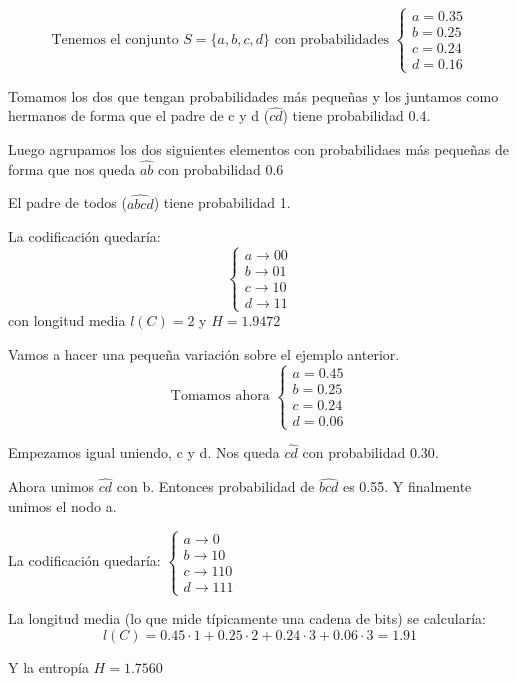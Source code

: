 \begin{example}
	\[\text{Tenemos el conjunto } S = \{ a , b , c , d\} \text{ con probabilidades }
	\begin{cases}
	a = 0.35\\b = 0.25\\ c= 0.24\\ d = 0.16
	\end{cases}\]

	Tomamos los dos que tengan probabilidades más pequeñas y los juntamos como hermanos de forma que el padre de c y d ($\widehat{cd}$) tiene probabilidad 0.4.

	Luego agrupamos los dos siguientes elementos con probabilidaes más pequeñas de forma que nos queda $\widehat{ab}$ con probabilidad 0.6

	El padre de todos ($\widehat{abcd}$) tiene probabilidad 1.

	La codificación quedaría:
	 $$\begin{cases}
	 a \rightarrow 00\\ b \rightarrow 01 \\c \rightarrow 10 \\ d \rightarrow 11
	 \end{cases}$$
	 con longitud media $l(C) = 2$ y $H = 1.9472$
\end{example}


\begin{example}
	Vamos a hacer una pequeña variación sobre el ejemplo anterior.
	\[\text{Tomamos ahora }\begin{cases}
	a = 0.45 \\ b = 0.25\\c = 0.24 \\ d = 0.06
	\end{cases}\]

	Empezamos igual uniendo, c y d. Nos queda $\widehat{cd}$ con probabilidad 0.30.

	Ahora unimos $\widehat{cd}$ con b. Entonces probabilidad de $ \widehat{bcd}$ es 0.55. Y finalmente unimos el nodo a.

	La codificación quedaría: $\begin{cases}
	a \rightarrow 0 \\ b \rightarrow 10 \\ c \rightarrow 110\\ d \rightarrow 111
	\end{cases}$

	La longitud media (lo que mide típicamente una cadena de bits) se calcularía:
	$$l(C) = 0.45 \cdot 1 + 0.25 \cdot 2 + 0.24 \cdot 3 + 0.06 \cdot 3 = 1.91$$

	Y la entropía $H = 1.7560$
\end{example}

